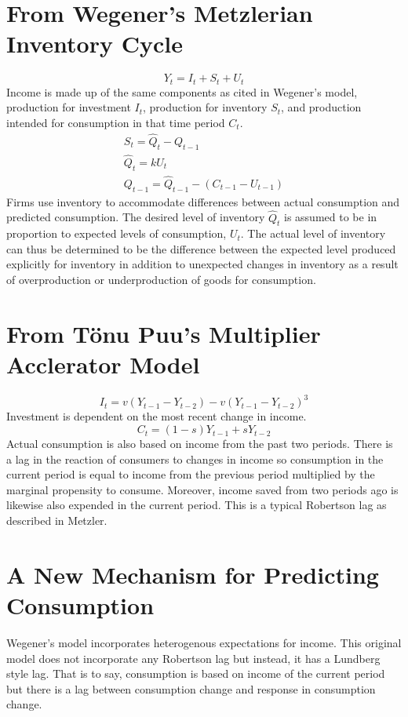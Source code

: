 \documentclass[]{article}
\begin{document}
\section*{From Wegener's Metzlerian Inventory Cycle}
\begin{equation}
	Y_t=I_t+S_t+U_t
\end{equation}
Income is made up of the same components as cited in Wegener's model, production for investment $I_t$, production for inventory $S_t$, and production intended for consumption in that time period $C_t$.
\begin{gather}
	S_t=\hat Q_t -Q_{t-1}\\
	\hat Q_t=k U_t\\
	Q_{t-1}=\hat Q_{t-1}-(C_{t-1}-U_{t-1})
\end{gather}
Firms use inventory to accommodate differences between actual consumption and predicted consumption. The desired level of inventory $\hat Q_t$ is assumed to be in proportion to expected levels of consumption, $U_t$. The actual level of inventory can thus be determined to be the difference between the expected level produced explicitly for inventory in addition to unexpected changes in inventory as a result of overproduction or underproduction of goods for consumption.
\section*{From T\"{o}nu Puu's Multiplier Acclerator Model}
\begin{equation}
	I_t=v(Y_{t-1}-Y_{t-2})-v(Y_{t-1}-Y_{t-2})^3
\end{equation}
Investment is dependent on the most recent change in income.
\begin{equation}
	C_t=(1-s)Y_{t-1}+sY_{t-2}
\end{equation}
Actual consumption is also based on income from the past two periods. There is a lag in the reaction of consumers to changes in income so consumption in the current period is equal to income from the previous period multiplied by the marginal propensity to consume. Moreover, income saved from two periods ago is likewise also expended in the current period. This is a typical Robertson lag as described in Metzler.
\section*{A New Mechanism for Predicting Consumption}
Wegener's model incorporates heterogenous expectations for income. This original model does not incorporate any Robertson lag but instead, it has a Lundberg style lag. That is to say, consumption is based on income of the current period but there is a lag between consumption change and response in consumption change. 
\end{document}
